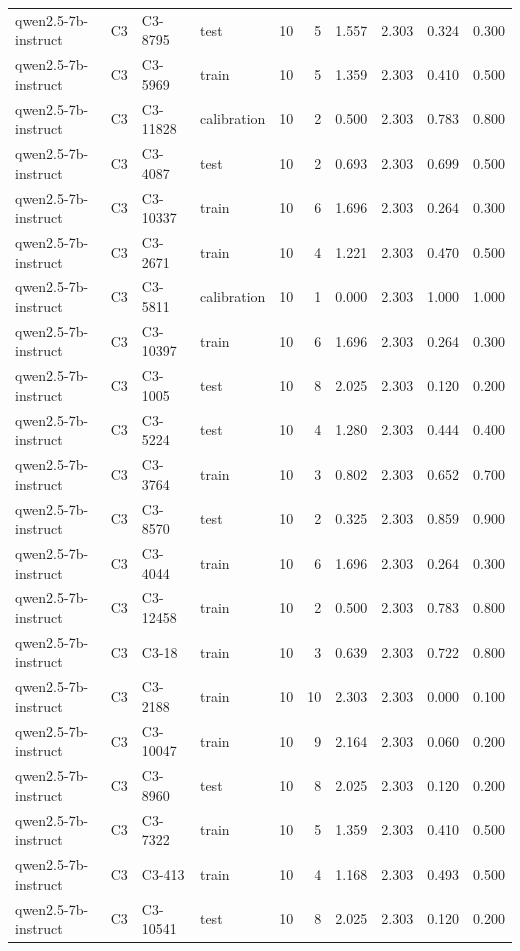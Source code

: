 \begin{table}
\begin{tabular}{llllrrrrrr}
qwen2.5-7b-instruct & C3 & C3-8795 & test & 10 & 5 & 1.557 & 2.303 & 0.324 & 0.300 \\
qwen2.5-7b-instruct & C3 & C3-5969 & train & 10 & 5 & 1.359 & 2.303 & 0.410 & 0.500 \\
qwen2.5-7b-instruct & C3 & C3-11828 & calibration & 10 & 2 & 0.500 & 2.303 & 0.783 & 0.800 \\
qwen2.5-7b-instruct & C3 & C3-4087 & test & 10 & 2 & 0.693 & 2.303 & 0.699 & 0.500 \\
qwen2.5-7b-instruct & C3 & C3-10337 & train & 10 & 6 & 1.696 & 2.303 & 0.264 & 0.300 \\
qwen2.5-7b-instruct & C3 & C3-2671 & train & 10 & 4 & 1.221 & 2.303 & 0.470 & 0.500 \\
qwen2.5-7b-instruct & C3 & C3-5811 & calibration & 10 & 1 & 0.000 & 2.303 & 1.000 & 1.000 \\
qwen2.5-7b-instruct & C3 & C3-10397 & train & 10 & 6 & 1.696 & 2.303 & 0.264 & 0.300 \\
qwen2.5-7b-instruct & C3 & C3-1005 & test & 10 & 8 & 2.025 & 2.303 & 0.120 & 0.200 \\
qwen2.5-7b-instruct & C3 & C3-5224 & test & 10 & 4 & 1.280 & 2.303 & 0.444 & 0.400 \\
qwen2.5-7b-instruct & C3 & C3-3764 & train & 10 & 3 & 0.802 & 2.303 & 0.652 & 0.700 \\
qwen2.5-7b-instruct & C3 & C3-8570 & test & 10 & 2 & 0.325 & 2.303 & 0.859 & 0.900 \\
qwen2.5-7b-instruct & C3 & C3-4044 & train & 10 & 6 & 1.696 & 2.303 & 0.264 & 0.300 \\
qwen2.5-7b-instruct & C3 & C3-12458 & train & 10 & 2 & 0.500 & 2.303 & 0.783 & 0.800 \\
qwen2.5-7b-instruct & C3 & C3-18 & train & 10 & 3 & 0.639 & 2.303 & 0.722 & 0.800 \\
qwen2.5-7b-instruct & C3 & C3-2188 & train & 10 & 10 & 2.303 & 2.303 & 0.000 & 0.100 \\
qwen2.5-7b-instruct & C3 & C3-10047 & train & 10 & 9 & 2.164 & 2.303 & 0.060 & 0.200 \\
qwen2.5-7b-instruct & C3 & C3-8960 & test & 10 & 8 & 2.025 & 2.303 & 0.120 & 0.200 \\
qwen2.5-7b-instruct & C3 & C3-7322 & train & 10 & 5 & 1.359 & 2.303 & 0.410 & 0.500 \\
qwen2.5-7b-instruct & C3 & C3-413 & train & 10 & 4 & 1.168 & 2.303 & 0.493 & 0.500 \\
qwen2.5-7b-instruct & C3 & C3-10541 & test & 10 & 8 & 2.025 & 2.303 & 0.120 & 0.200 \\

\end{tabular}
\end{table}
